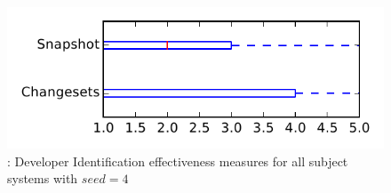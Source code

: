 
\begin{figure}
\centering
\includegraphics[height=0.4\textheight]{figures/dit_seed/rq1_tiny_4}
\caption{\rtwo: Developer Identification effectiveness measures for all subject systems with $seed=4$}
\label{fig:dit_seed:rq1:tiny}
\end{figure}
